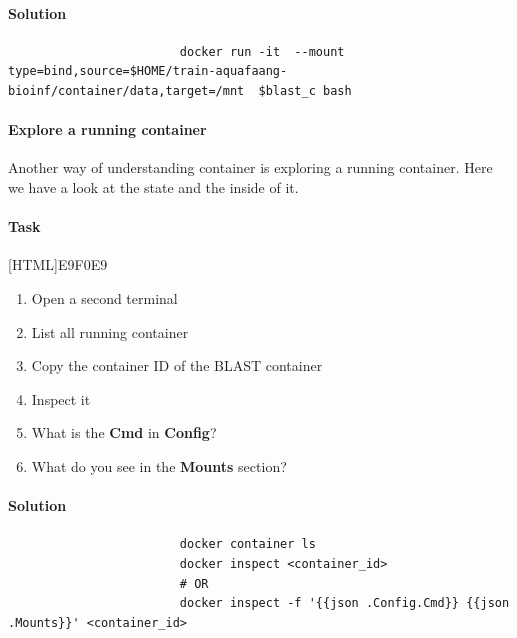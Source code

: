 \documentclass[12pt]{article}
\begin{document}
				\paragraph{Solution}	
		
					\begin{minipage}{\linewidth}
						\begin{lstlisting}
						docker run -it 	--mount type=bind,source=$HOME/train-aquafaang-bioinf/container/data,target=/mnt  $blast_c bash
					\end{lstlisting}
				\end{minipage}
			
 			\paragraph{Explore a running container}
				Another way of understanding container is exploring a running container.
				Here we have a look at the state and the inside of it.
	
			\paragraph{Task}
				[HTML]{E9F0E9}{\parbox{\linewidth}{%
						\begin{enumerate}
							\item Open a second terminal
							\item List all running container
							\item Copy the container ID of the BLAST container
							\item Inspect it
							\item What is the \textbf{Cmd} in \textbf{Config}?
							\item  What do you see in the \textbf{Mounts} section?
						\end{enumerate}
				}}

			\paragraph{Solution}	
	
				\begin{minipage}{\linewidth}
					\begin{lstlisting}
						docker container ls
						docker inspect <container_id>
						# OR 
						docker inspect -f '{{json .Config.Cmd}} {{json .Mounts}}' <container_id>
					\end{lstlisting}
				\end{minipage}		
	
\end{document}
